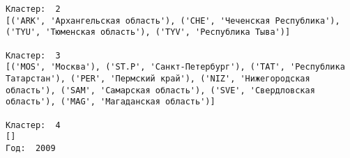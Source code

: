 \documentclass[11pt]{article}
\begin{document}
\begin{Verbatim}[commandchars=\\\{\}]
Кластер:  2
[('ARK', 'Архангельская область'), ('CHE', 'Чеченская Республика'), ('TYU', 'Тюменская область'), ('TYV', 'Республика Тыва')]

Кластер:  3
[('MOS', 'Москва'), ('ST.P', 'Санкт-Петербург'), ('TAT', 'Республика Татарстан'), ('PER', 'Пермский край'), ('NIZ', 'Нижегородская область'), ('SAM', 'Самарская область'), ('SVE', 'Свердловская область'), ('MAG', 'Магаданская область')]

Кластер:  4
[]
Год:  2009

    \end{Verbatim}

    \begin{center}
    \end{center}
    { \hspace*{\fill} \\}
    
\end{document}
